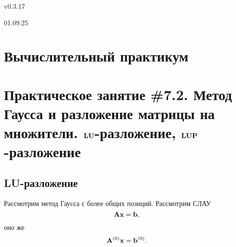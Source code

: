 \documentclass[12pt]{article}
\begin{document}
    \begin{flushright}
    {v0.3.17}
    \end{flushright}
    \begin{flushright}
    	{01.09.25}
    \end{flushright}
    \section*{Вычислительный практикум}
    \section*{Практическое занятие \#7.2. Метод Гаусса и разложение матрицы на множители. $\bold{LU}$-раз\linebreak ложение, $\bold{LUP}$-разложение}

    \subsection*{LU-разложение}

    Рассмотрим метод Гаусса с более общих позиций. Рассмотрим СЛАУ
    \begin{equation}
        \bold{Ax}=\bold{b},
        \label{7.2:f1}
    \end{equation}
    оно же
    \begin{equation}
        \bold{A}^{\left(0\right)}\bold{x}=\bold{b}^{\left(0\right)}.
        \label{7.2:f2}
    \end{equation}
\end{document}
